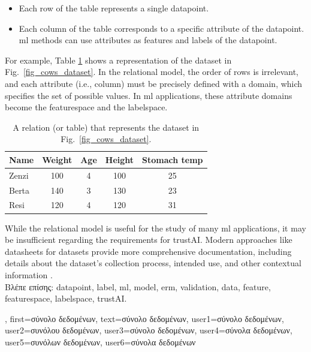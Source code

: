{{		\begin{itemize} 
		\item Each row of the table represents a single \gls{datapoint}.
		\item Each column of the table corresponds to a specific attribute of the \gls{datapoint}. 
		\gls{ml} methods can use attributes as \gls{feature}s and \gls{label}s of the \gls{datapoint}.
		\end{itemize}
		For example, Table \ref{tab:cowdata} shows a representation of the dataset in Fig.\ \ref{fig_cows_dataset}. 
		In the relational \gls{model}, the order of rows is irrelevant, and each attribute (i.e., column) must be 
		precisely defined with a domain, which specifies the set of possible values. In \gls{ml} applications, 
		these attribute domains become the \gls{featurespace} and the \gls{labelspace}.
		\begin{table}[H]
			\centering
			\begin{tabular}{lcccc}
				\hline
				\textbf{Name} & \textbf{Weight} & \textbf{Age} & \textbf{Height} & \textbf{Stomach temp} \\
				\hline
				Zenzi & 100 & 4 & 100 & 25 \\
				Berta & 140 & 3 & 130 & 23 \\
				Resi  & 120 & 4 & 120 & 31 \\
				\hline
			\end{tabular}
			\caption{A relation (or table) that represents the dataset in Fig.\ \ref{fig_cows_dataset}.}
			\label{tab:cowdata}
		\end{table}
 While the relational \gls{model} is useful for the study of many \gls{ml} applications, it may be 
 insufficient regarding the requirements for \gls{trustAI}. Modern 
 approaches like datasheets for datasets provide more comprehensive 
 documentation, including details about the dataset’s collection process, intended 
 use, and other contextual information \cite{DatasheetData2021}.\\
 \foreignlanguage{greek}{Βλέπε επίσης:} \gls{datapoint}, \gls{label}, \gls{ml}, \gls{model}, \gls{erm}, \gls{validation}, \gls{data}, \gls{feature}, \gls{featurespace}, \gls{labelspace}, \gls{trustAI}.},
 first={\foreignlanguage{greek}{σύνολο δεδομένων}},
 text={\foreignlanguage{greek}{σύνολο δεδομένων}},
 user1={\foreignlanguage{greek}{σύνολο δεδομένων}}, %
 user2={\foreignlanguage{greek}{συνόλου δεδομένων}}, %
 user3={\foreignlanguage{greek}{σύνολο δεδομένων}}, %
 user4={\foreignlanguage{greek}{σύνολα δεδομένων}}, %
 user5={\foreignlanguage{greek}{συνόλων δεδομένων}}, %
 user6={\foreignlanguage{greek}{σύνολα δεδομένων}} %
}


